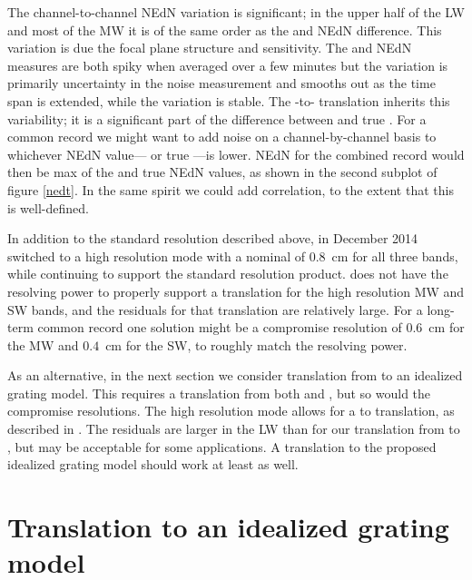 \documentclass[journal]{IEEEtran}
\begin{document}
The {\airs} channel-to-channel NEdN variation is significant; in the
upper half of the LW and most of the MW it is of the same order as
the {\airs} and {\cris} NEdN difference.  This variation is due the
{\airs} focal plane structure and sensitivity.  The {\airs} and
{\cris} NEdN measures are both spiky when averaged over a few
minutes but the {\cris} variation is primarily uncertainty in the
noise measurement and smooths out as the time span is extended,
while the {\airs} variation is stable.  The {\airs}-to-{\cris}
translation inherits this variability; it is a significant part of
the difference between {\airs} {\cris} and true {\cris}.  For a
common record we might want to add noise on a channel-by-channel
basis to whichever NEdN value---{\airs} {\cris} or true {\cris}---is
lower.  NEdN for the combined record would then be max of the
{\airs} {\cris} and true {\cris} NEdN values, as shown in the second
subplot of figure \ref{nedt}.  In the same spirit we could add
{\airs} correlation, to the extent that this is well-defined.

In addition to the standard resolution described above, in December
2014 {\cris} switched to a high resolution mode with a nominal
{\opd} of $0.8$~cm for all three bands, while continuing to support
the standard resolution product.  {\airs} does not have the
resolving power to properly support a translation for the {\cris}
high resolution MW and SW bands, and the residuals for that
translation are relatively large.  For a long-term common record one
solution might be a compromise {\cris} resolution of $0.6$~cm for
the MW and $0.4$~cm for the SW, to roughly match the {\airs}
resolving power.

As an alternative, in the next section we consider translation from
{\airs} to an idealized grating model.  This requires a translation
from both {\airs} and {\cris}, but so would the compromise {\cris}
resolutions.  The {\cris} high resolution mode allows for a {\cris}
to {\airs} translation, as described in \cite{git:decon}.  The
residuals are larger in the LW than for our translation from {\airs}
to {\cris}, but may be acceptable for some applications.  A {\cris}
translation to the proposed idealized grating model should work at
least as well.

\section{Translation to an idealized grating model}
\label{airsL1d}
\end{document}
